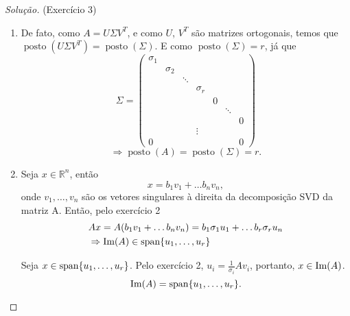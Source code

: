 \documentclass[a4paper,10pt]{article}
\newenvironment{solution}
  {\begin{proof}[Solução]}
  {\end{proof}}
\DeclareMathOperator{\posto}{posto}
\newcommand{\im}[1]{\textnormal{Im}(#1)}
\begin{document}
  \begin{solution}{(Exercício 3)}

    \begin{enumerate}
      \item De fato, como $A = U\Sigma V^T$, e como $U$, $V^T$ são matrizes ortogonais,
      temos que $\posto( U\Sigma V^T) = \posto(\Sigma)$. E como $\posto(\Sigma) = r$,
      já que
      \begin{equation*}
        \Sigma =
        \begin{pmatrix}
          \sigma_1 &          &       &          & \\
                   & \sigma_2 &       &          & \\
                   &          & \ddots&          & \\
                   &          &       & \sigma_r & \\
                   &          &       &          & 0 & \\
                   & & & & & \ddots& \\
                   & & & & & & 0 \\
                   & & & \vdots & & & \\
                   0 & & & & & & 0
        \end{pmatrix}
      \end{equation*}
      \begin{equation*}
        \Rightarrow \posto(A) = \posto(\Sigma) = r.
      \end{equation*}

      \item Seja $x \in \mathbb{R}^n$, então
        \begin{equation*}
          x = b_1v_1 + \dots b_nv_n,
        \end{equation*}
        onde $v_1,\dots,v_n$ são os vetores singulares à direita da decomposição
        SVD da matriz A. Então, pelo exercício 2
        \begin{equation*}
          \begin{split}
            &Ax = A(b_1v_1 + \dots b_nv_n) = b_1\sigma_1u_1 + \dots b_r\sigma_ru_n \\
            & \Rightarrow \im{A} \in \textnormal{span}\{u_1,\dots,u_r\}
          \end{split}
        \end{equation*}

        Seja $x\in \textnormal{span}\{u_1,\dots,u_r\}$. Pelo exercício 2, $u_i =
        \frac{1}{\sigma_i}Av_i$, portanto, $x \in \im{A}$.
        \begin{equation*}
          \im{A} = \textnormal{span}\{u_1,\dots,u_r\}.
        \end{equation*}


\end{enumerate}
\end{solution}
\end{document}
